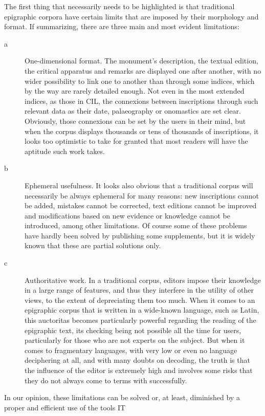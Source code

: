 \documentclass[amsthm,ebook]{saparticle}
\begin{document}
The first thing that necessarily needs to be highlighted is that traditional epigraphic corpora have certain limits that
are imposed by their morphology and format. If summarizing, there are three main and most evident limitations: 
\begin{description}
\item[a] One-dimensional format. The monument's description, the textual edition, the critical apparatus and remarks are
displayed one after another, with no wider possibility to link one to another than through some indices, which by the
way are rarely detailed enough. Not even in the most extended indices, as those in CIL, the connexions between
inscriptions through such relevant data as their date, palaeography or onomastics are set clear. Obviously, those
connexions can be set by the users in their mind, but when the corpus displays thousands or tens of thousands of
inscriptions, it looks too optimistic to take for granted that most readers will have the aptitude such work takes.

\item[b] Ephemeral usefulness. It looks also obvious that a traditional corpus will necessarily be always ephemeral for many
reasons: new inscriptions cannot be added, mistakes cannot be corrected, text editions cannot be improved and
modifications based on new evidence or knowledge cannot be introduced, among other limitations. Of course some of these
problems have hardly been solved by publishing some supplements, but it is widely known that these are partial
solutions only.

\item[c] Authoritative work. In a traditional corpus, editors impose their knowledge in a large range of features, and thus
they interfere in the utility of other views, to the extent of depreciating them too much. When it comes to an
epigraphic corpus that is written in a wide-known language, such as Latin, this auctoritas becomes particularly
powerful regarding the reading of the epigraphic text, its checking being not possible all the time for users,
particularly for those who are not experts on the subject. But when it comes to fragmentary languages, with very low or
even no language deciphering at all, and with many doubts on decoding, the truth is that the influence of the editor is
extremely high and involves some risks that they do not always come to terms with successfully.


\end{description}
In our opinion, these limitations can be solved or, at least, diminished by a proper and efficient use of the tools IT
\end{document}
